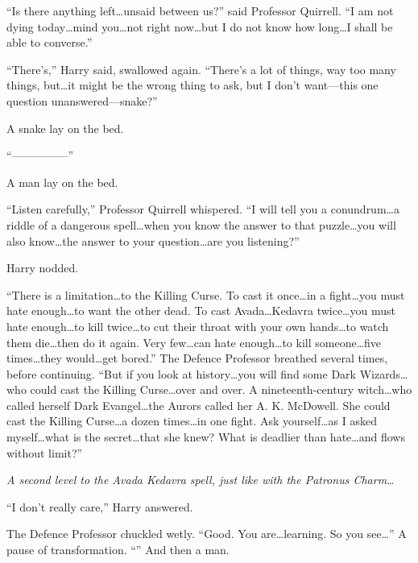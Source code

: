 “Is there anything left…unsaid between us?” said Professor Quirrell. “I am not dying today…mind you…not right now…but I do not know how long…I shall be able to converse.”

“There’s,” Harry said, swallowed again. “There’s a lot of things, way too many things, but…it might be the wrong thing to ask, but I don’t want—this one question unanswered—snake?”

A snake lay on the bed.

“—————”

A man lay on the bed.

“Listen carefully,” Professor Quirrell whispered. “I will tell you a conundrum…a riddle of a dangerous spell…when you know the answer to that puzzle…you will also know…the answer to your question…are you listening?”

Harry nodded.

“There is a limitation…to the Killing Curse. To cast it once…in a fight…you must hate enough…to want the other dead. To cast Avada…Kedavra twice…you must hate enough…to kill twice…to cut their throat with your own hands…to watch them die…then do it again. Very few…can hate enough…to kill someone…five times…they would…get bored.” The Defence Professor breathed several times, before continuing. “But if you look at history…you will find some Dark Wizards…who could cast the Killing Curse…over and over. A nineteenth-century witch…who called herself Dark Evangel…the Aurors called her A. K. McDowell. She could cast the Killing Curse…a dozen times…in one fight. Ask yourself…as I asked myself…what is the secret…that she knew? What is deadlier than hate…and flows without limit?”

\emph{A second level to the Avada Kedavra spell, just like with the Patronus Charm…}

“I don’t really care,” Harry answered.

The Defence Professor chuckled wetly. “Good. You are…learning. So you see…” A pause of transformation. “” And then a man.


